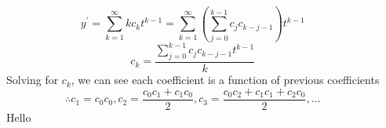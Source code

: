 \documentclass[25pt, a0paper, portrait]{tikzposter}
\begin{document}
\begin{columns}
{\begin{equation*}
            y^\prime = \sum\limits_{k=1}^{\infty}kc_kt^{k-1} = \sum\limits_{k=1}^{\infty} \left(\sum\limits_{j=0}^{k-1}c_jc_{k-j-1}\right)t^{k-1}
        \end{equation*}
        \begin{equation}
            c_k = \frac{\sum\limits_{j=0}^{k-1}c_jc_{k-j-1}t^{k-1}}{k}
        \end{equation}
        Solving for $c_k$, we can see each coefficient is a function of previous coefficients
        \begin{equation*}
            \therefore c_1 = c_0c_0, c_2 = \frac{c_0c_1 + c_1c_0}{2}, c_3 = \frac{c_0c_2 + c_1c_1+ c_2c_0}{2},\dots
        \end{equation*}
    }
    {
        Hello
    }
\end{columns}
\end{document}
